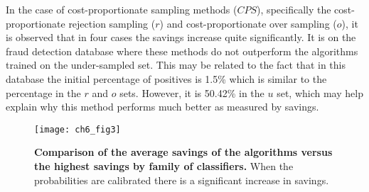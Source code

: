In the case of cost-proportionate sampling methods ($CPS$), specifically the 
cost-proportionate rejection sampling ($r$) and cost-proportionate over 
sampling ($o$), it is observed that in four cases the savings increase quite 
significantly. It is on the fraud detection database where these methods do not outperform the 
algorithms trained on the under-sampled set. This may be related to the fact that in this 
database the initial percentage of positives is 1.5\% which is similar to the percentage in the 
$r$ and   $o$ sets. However, it is 50.42\% in the $u$ set, which may help explain why this method 
performs much better as measured by savings.

\begin{figure}[!t]
  \centering
  \texttt{[image: ch6\_fig3]}
  \caption{\textbf{Comparison of the average savings of the algorithms versus the 
    highest savings by family of classifiers.} When the probabilities are calibrated there is a 
    significant increase in savings.}
  \label{fig:6:comparison_family}
\end{figure}

